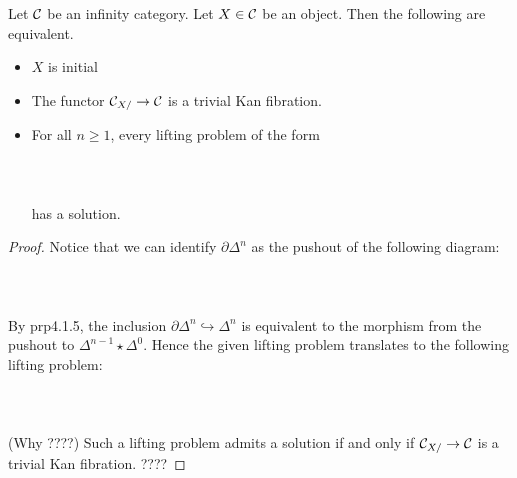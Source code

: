 \documentclass[a4paper]{article}
\begin{document}
\begin{prp}{}{} Let $\mathcal{C}$ be an infinity category. Let $X\in\mathcal{C}$ be an object. Then the following are equivalent. 
\begin{itemize}
\item $X$ is initial
\item The functor $\mathcal{C}_{X/}\to\mathcal{C}$ is a trivial Kan fibration. 
\item For all $n\geq 1$, every lifting problem of the form \\~\\
\\~\\
has a solution. 
\end{itemize} \tcbline
\begin{proof}
Notice that we can identify $\partial\Delta^n$ as the pushout of the following diagram: \\~\\
\\~\\
By prp4.1.5, the inclusion $\partial\Delta^n\hookrightarrow\Delta^n$ is equivalent to the morphism from the pushout to $\Delta^{n-1}\star\Delta^0$. Hence the given lifting problem translates to the following lifting problem: \\~\\
\\~\\
(Why ????) Such a lifting problem admits a solution if and only if $\mathcal{C}_{X/}\to\mathcal{C}$ is a trivial Kan fibration. ????
\end{proof}
\end{prp}
\end{document}
